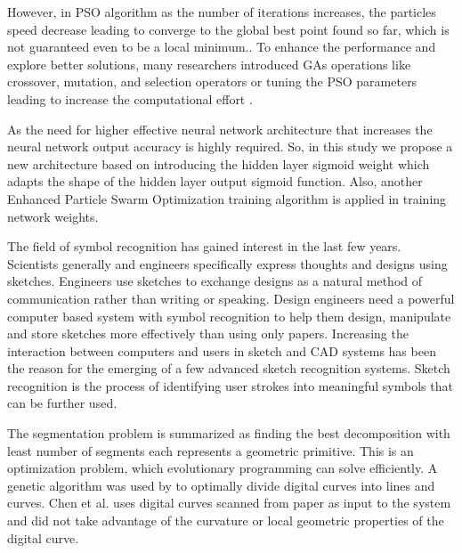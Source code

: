 \documentclass[10pt]{article}
\begin{document}
However, in PSO algorithm as the number of iterations increases, the particles speed decrease leading to converge to the global best point found so far, which is not guaranteed even to be a local minimum.. To enhance the performance and explore better solutions, many researchers introduced GAs operations like crossover, mutation, and selection operators or tuning the PSO parameters leading to increase the computational effort  \cite{Ouyang2009IJCAI}.

As the need for higher effective neural network architecture that increases the neural network output accuracy is highly required. So, in this study we propose a new architecture based on introducing the hidden layer sigmoid weight which adapts the shape of the hidden layer output sigmoid function. Also, another Enhanced Particle Swarm Optimization training algorithm is applied in training network weights.


The field of symbol recognition has gained interest in the last few years. Scientists generally and engineers specifically express thoughts and designs using sketches. Engineers use sketches to exchange designs as a natural method of communication rather than writing or speaking. Design engineers need a powerful computer based system with symbol recognition to help them design, manipulate and store sketches more effectively than using only papers. Increasing the interaction between computers and users in sketch and CAD systems has been the reason for the emerging of a few advanced sketch recognition systems. Sketch recognition is the process of identifying user strokes into meaningful symbols that can be further used.  

The segmentation problem is summarized as finding the best decomposition with least number of segments each represents a geometric primitive. This is an optimization problem, which evolutionary programming can solve efficiently. A genetic algorithm was used by \cite{CruveDivisionSwarm} to optimally divide digital curves into lines and curves. Chen et al.\cite{CruveDivisionSwarm} uses digital curves scanned from paper as input to the system and did not take advantage of the curvature or local geometric properties of the digital curve.
\end{document}
